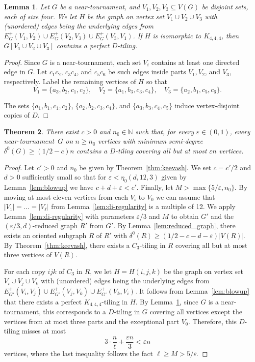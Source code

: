 \documentclass[11pt]{amsart}
\newtheorem{theorem}{Theorem}[section]
\newtheorem{lemma}[theorem]{Lemma}
\def\N{\mathbb{N}}
\newcommand{\veps}{\varepsilon}
\begin{document}
\begin{lemma} \label{lem:k444}
    Let $G$ be a near-tournament, and $V_1, V_2, V_3 \subseteq V(G)$ be disjoint sets, each of size four. We let $H$ be the graph on vertex set $V_1 \cup V_2 \cup V_3$ with (unordered) edges being the underlying edges from $E^+_{G}(V_1, V_2) \cup E^+_{G}(V_2, V_3) \cup E^+_{G}(V_3, V_1)$. If $H$ is isomorphic to $K_{4,4,4}$, then $G[V_1 \cup V_2 \cup V_3]$ contains a perfect $D$-tiling.
\end{lemma}

\begin{proof}
    Since $G$ is a near-tournament, each set $V_i$ contains at least one directed edge in $G$. Let $c_1c_2$, $c_3c_4$, and $c_5c_6$ be such edges inside parts $V_1, V_2$, and $V_3$, respectively. Label the remaining vertices of $H$ so that 
    $$V_1 = \{a_3, b_2, c_1, c_2 \}, \quad
    V_2 = \{a_1, b_3, c_3, c_4 \}, \quad
    V_3 = \{a_2, b_1, c_5, c_6 \}.$$

    The sets $\{a_1, b_1, c_1, c_2\}$, $\{a_2, b_2, c_3, c_4\}$, and $\{a_3, b_3, c_4, c_5\}$ induce vertex-disjoint copies of $D$.
\end{proof}

\begin{theorem}\label{thm:almost_perfect}
    There exist $c > 0$ and $n_0 \in \N$ such that, for every $\veps \in (0,1)$, every near-tournament~$G$ on $n\ge n_0$ vertices with minimum semi-degree $\delta^0(G) \ge (1/2 - c)n$ contains a $D$-tiling covering all but at most $\veps n$ vertices.
\end{theorem}

\begin{proof}
    Let $c'>0$ and $n_0$ be given by Theorem~\ref{thm:keevash}. We set $c = c'/2$ and $d>0$ sufficiently small so that for $\veps < \eta_0(d, 12, 3)$ given by Lemma~\ref{lem:blowup} we have $c+d+\veps < c'$. Finally, let $M > \max\{5/\veps, n_0\}$.
    By moving at most eleven vertices from each $V_i$ to $V_0$ we can assume that $|V_1|=\dots=|V_\ell|$ from Lemma~\ref{lem:di-regularity} is a multiple of 12.
    We apply Lemma~\ref{lem:di-regularity} with parameters $\veps/3$ and $M$ to obtain $G'$ and the $(\veps/3, d)$-reduced graph $R'$ from $G'$.
    By Lemma~\ref{lem:reduced_graph}, there exists an oriented subgraph $R$ of $R'$ with $\delta^0(R)\ge (1/2-c-d-\veps) |V(R)|$.
    By Theorem~\ref{thm:keevash}, there exists a $C_3$-tiling in $R$ covering all but at most three vertices of $V(R)$. 

    For each copy $ijk$ of $C_3$ in $R$, we let $H=H(i,j,k)$ be the graph on vertex set $V_i \cup V_j \cup V_k$ with (unordered) edges being the underlying edges from $E^+_{G'}(V_i, V_j) \cup E^+_{G'}(V_j, V_k) \cup E^+_{G'}(V_k, V_i)$. It follows from Lemma~\ref{lem:blowup} that there exists a perfect $K_{4,4,4}$-tiling in $H$. By Lemma~\ref{lem:k444}, since $G$ is a near-tournament, this corresponds to a $D$-tiling in $G$ covering all vertices except the vertices from at most three parts and the exceptional part $V_0$. Therefore, this $D$-tiling misses at most
    $$ 3\cdot \frac{n}{\ell} + \frac{\veps n}{3} < \veps n$$
    vertices, where the last inequality follows the fact $\ell \ge M > 5/\veps$.
\end{proof}
\end{document}

